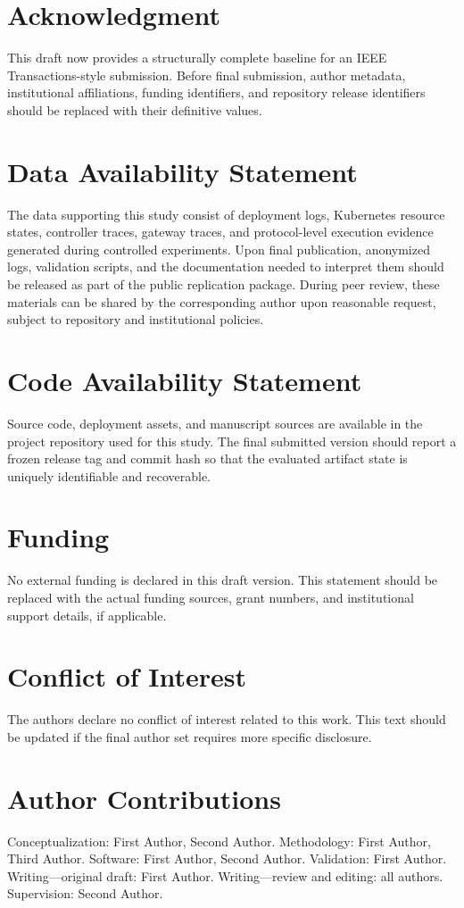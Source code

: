\section*{Acknowledgment}
This draft now provides a structurally complete baseline for an IEEE Transactions-style submission. Before final submission, author metadata, institutional affiliations, funding identifiers, and repository release identifiers should be replaced with their definitive values.

\section*{Data Availability Statement}
The data supporting this study consist of deployment logs, Kubernetes resource states, controller traces, gateway traces, and protocol-level execution evidence generated during controlled experiments. Upon final publication, anonymized logs, validation scripts, and the documentation needed to interpret them should be released as part of the public replication package. During peer review, these materials can be shared by the corresponding author upon reasonable request, subject to repository and institutional policies.

\section*{Code Availability Statement}
Source code, deployment assets, and manuscript sources are available in the project repository used for this study. The final submitted version should report a frozen release tag and commit hash so that the evaluated artifact state is uniquely identifiable and recoverable.

\section*{Funding}
No external funding is declared in this draft version. This statement should be replaced with the actual funding sources, grant numbers, and institutional support details, if applicable.

\section*{Conflict of Interest}
The authors declare no conflict of interest related to this work. This text should be updated if the final author set requires more specific disclosure.

\section*{Author Contributions}
Conceptualization: First Author, Second Author. Methodology: First Author, Third Author. Software: First Author, Second Author. Validation: First Author. Writing---original draft: First Author. Writing---review and editing: all authors. Supervision: Second Author.
